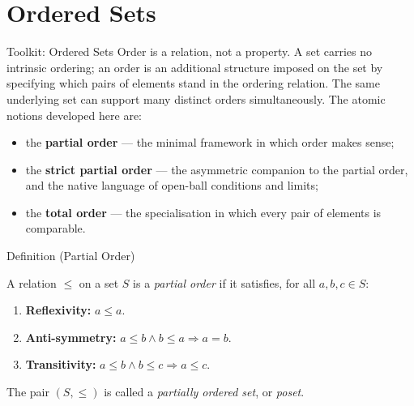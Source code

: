 
\section{Ordered Sets}
\label{sec:ordered-sets}

\begin{toolkitbox}{Toolkit: Ordered Sets}
Order is a relation, not a property.  A set carries no intrinsic ordering;
an order is an additional structure imposed on the set by specifying which
pairs of elements stand in the ordering relation.  The same underlying set
can support many distinct orders simultaneously.  The atomic notions
developed here are:
\begin{itemize}
  \item the \textbf{partial order} — the minimal framework in which order
        makes sense;
  \item the \textbf{strict partial order} — the asymmetric companion to the
        partial order, and the native language of open-ball conditions and
        limits;
  \item the \textbf{total order} — the specialisation in which every pair of
        elements is comparable.
\end{itemize}
\end{toolkitbox}


\begin{definitionbox}{Definition (Partial Order)}
\begin{definition}
\label{def:lattice-order-partial-order}
A relation $\leq$ on a set $S$ is a \emph{partial order} if it satisfies,
for all $a, b, c \in S$:
\begin{enumerate}
  \item \textbf{Reflexivity:} $a \leq a$.
  \item \textbf{Anti-symmetry:} $a \leq b \land b \leq a \Longrightarrow a = b$.
  \item \textbf{Transitivity:} $a \leq b \land b \leq c \Longrightarrow a \leq c$.
\end{enumerate}
The pair $(S, \leq)$ is called a \emph{partially ordered set}, or \emph{poset}.
\end{definition}
\end{definitionbox}

